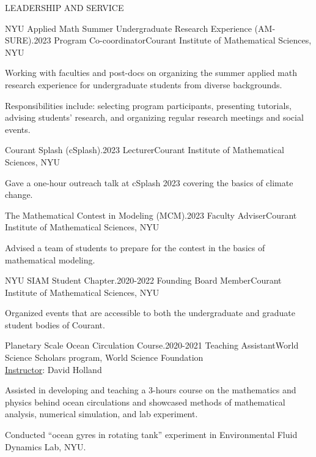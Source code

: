 \documentclass{resume} %
\begin{document}
\begin{rSection}{LEADERSHIP AND SERVICE}
\begin{rSubsection}{NYU Applied Math Summer Undergraduate Research Experience (AM-SURE).}{2023}
{Program Co-coordinator}{Courant Institute of Mathematical Sciences, NYU}
\item Working with faculties and post-docs on organizing the summer applied math research experience for undergraduate students from diverse backgrounds.
\item Responsibilities include: selecting program participants, presenting tutorials, advising students' research, and organizing regular research meetings and social events. 
\end{rSubsection}

\begin{rSubsection}{Courant Splash (cSplash).}{2023}
{Lecturer}{Courant Institute of Mathematical Sciences, NYU}
\item Gave a one-hour outreach talk at cSplash 2023 covering the basics of climate change. 
\end{rSubsection}

\begin{rSubsection}{The Mathematical Contest in Modeling (MCM).}{2023}
{Faculty Adviser}{Courant Institute of Mathematical Sciences, NYU}
\item Advised a team of students to prepare for the contest in the basics of mathematical modeling.
\end{rSubsection}

\begin{rSubsection}{NYU SIAM Student Chapter.}{2020-2022}
{Founding Board Member}{Courant Institute of Mathematical Sciences, NYU}
\item Organized events that are accessible to both the undergraduate and graduate student bodies of Courant.
\end{rSubsection}

\begin{rSubsection}{Planetary Scale Ocean Circulation Course.}{2020-2021}
{Teaching Assistant}{World Science Scholars program, World Science Foundation\\\underline{Instructor}: David Holland}
\item Assisted in developing and teaching a 3-hours course on the mathematics and physics behind ocean circulations and showcased methods of mathematical analysis, numerical simulation, and lab experiment.
\item Conducted ``ocean gyres in rotating tank'' experiment in Environmental Fluid Dynamics Lab, NYU.
\end{rSubsection}


\end{rSection}
\end{document}
